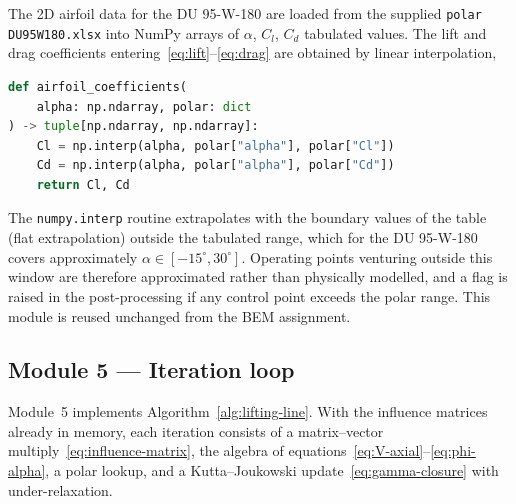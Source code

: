 The 2D airfoil data for the DU 95-W-180 are loaded from the supplied \texttt{polar DU95W180.xlsx} into NumPy arrays of $\alpha$, $C_l$, $C_d$ tabulated values. The lift and drag coefficients entering~\eqref{eq:lift}--\eqref{eq:drag} are obtained by linear interpolation,
\begin{lstlisting}[language=Python]
def airfoil_coefficients(
    alpha: np.ndarray, polar: dict
) -> tuple[np.ndarray, np.ndarray]:
    Cl = np.interp(alpha, polar["alpha"], polar["Cl"])
    Cd = np.interp(alpha, polar["alpha"], polar["Cd"])
    return Cl, Cd
\end{lstlisting}
The \texttt{numpy.interp} routine extrapolates with the boundary values of the table (flat extrapolation) outside the tabulated range, which for the DU 95-W-180 covers approximately $\alpha\in[-15^\circ,30^\circ]$. Operating points venturing outside this window are therefore approximated rather than physically modelled, and a flag is raised in the post-processing if any control point exceeds the polar range. This module is reused unchanged from the BEM assignment.

\subsection{Module 5 --- Iteration loop}
\label{sec:code-iteration}

Module~5 implements Algorithm~\ref{alg:lifting-line}. With the influence matrices already in memory, each iteration consists of a matrix--vector multiply~\eqref{eq:influence-matrix}, the algebra of equations~\eqref{eq:V-axial}--\eqref{eq:phi-alpha}, a polar lookup, and a Kutta--Joukowski update~\eqref{eq:gamma-closure} with under-relaxation.


